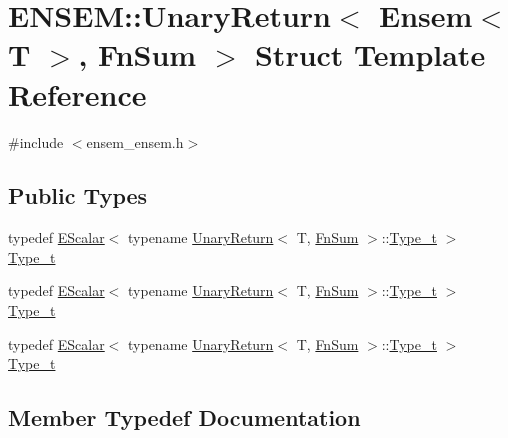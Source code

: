 \hypertarget{structENSEM_1_1UnaryReturn_3_01Ensem_3_01T_01_4_00_01FnSum_01_4}{}\section{E\+N\+S\+EM\+:\+:Unary\+Return$<$ Ensem$<$ T $>$, Fn\+Sum $>$ Struct Template Reference}
\label{structENSEM_1_1UnaryReturn_3_01Ensem_3_01T_01_4_00_01FnSum_01_4}


{\ttfamily \#include $<$ensem\+\_\+ensem.\+h$>$}

\subsection*{Public Types}
\begin{DoxyCompactItemize}
\item 
typedef \mbox{\hyperlink{classENSEM_1_1EScalar}{E\+Scalar}}$<$ typename \mbox{\hyperlink{structENSEM_1_1UnaryReturn}{Unary\+Return}}$<$ T, \mbox{\hyperlink{structENSEM_1_1FnSum}{Fn\+Sum}} $>$\+::\mbox{\hyperlink{structENSEM_1_1UnaryReturn_3_01Ensem_3_01T_01_4_00_01FnSum_01_4_ad99eb2820cca4a76378ee89c9abbf4e3}{Type\+\_\+t}} $>$ \mbox{\hyperlink{structENSEM_1_1UnaryReturn_3_01Ensem_3_01T_01_4_00_01FnSum_01_4_ad99eb2820cca4a76378ee89c9abbf4e3}{Type\+\_\+t}}
\item 
typedef \mbox{\hyperlink{classENSEM_1_1EScalar}{E\+Scalar}}$<$ typename \mbox{\hyperlink{structENSEM_1_1UnaryReturn}{Unary\+Return}}$<$ T, \mbox{\hyperlink{structENSEM_1_1FnSum}{Fn\+Sum}} $>$\+::\mbox{\hyperlink{structENSEM_1_1UnaryReturn_3_01Ensem_3_01T_01_4_00_01FnSum_01_4_ad99eb2820cca4a76378ee89c9abbf4e3}{Type\+\_\+t}} $>$ \mbox{\hyperlink{structENSEM_1_1UnaryReturn_3_01Ensem_3_01T_01_4_00_01FnSum_01_4_ad99eb2820cca4a76378ee89c9abbf4e3}{Type\+\_\+t}}
\item 
typedef \mbox{\hyperlink{classENSEM_1_1EScalar}{E\+Scalar}}$<$ typename \mbox{\hyperlink{structENSEM_1_1UnaryReturn}{Unary\+Return}}$<$ T, \mbox{\hyperlink{structENSEM_1_1FnSum}{Fn\+Sum}} $>$\+::\mbox{\hyperlink{structENSEM_1_1UnaryReturn_3_01Ensem_3_01T_01_4_00_01FnSum_01_4_ad99eb2820cca4a76378ee89c9abbf4e3}{Type\+\_\+t}} $>$ \mbox{\hyperlink{structENSEM_1_1UnaryReturn_3_01Ensem_3_01T_01_4_00_01FnSum_01_4_ad99eb2820cca4a76378ee89c9abbf4e3}{Type\+\_\+t}}
\end{DoxyCompactItemize}


\subsection{Member Typedef Documentation}
\mbox{\label{structENSEM_1_1UnaryReturn_3_01Ensem_3_01T_01_4_00_01FnSum_01_4_ad99eb2820cca4a76378ee89c9abbf4e3}} 
